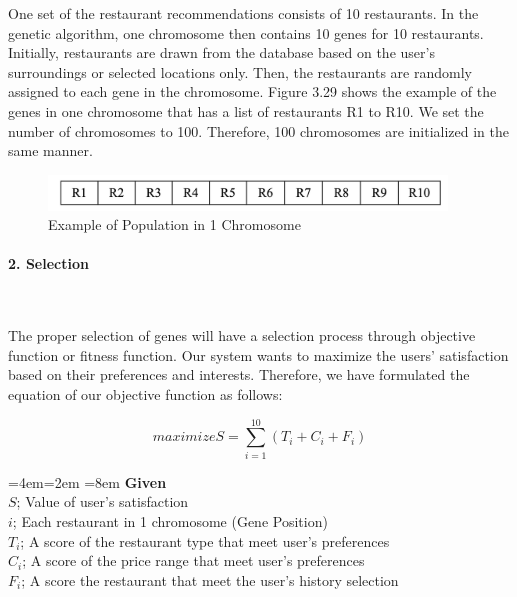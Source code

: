 \documentclass[12pt,oneside,openright,a4paper]{cpe-english-project}
\newenvironment{blockquote}{%
  \par%
  \medskip
  \leftskip=4em\rightskip=2em%
  \noindent\ignorespaces}{%
  \par\medskip}
\begin{document}
One set of the restaurant recommendations consists of 10 restaurants. In the genetic algorithm, one chromosome then contains 10 genes for 10 restaurants.  Initially, restaurants are drawn from the database based on the user's surroundings or selected locations only. Then, the restaurants are randomly assigned to each gene in the chromosome. Figure 3.29 shows the example of the genes in one chromosome that has a list of restaurants R1 to R10. We set the number of chromosomes to 100. Therefore, 100 chromosomes are initialized in the same manner.

\begin{figure}[H]\centering
\includegraphics[width=300pt]{./images/3ga_init.png}
\caption{Example of Population in 1 Chromosome}\label{fig:3ga_init}
\end{figure}

\paragraph*{2. Selection}\

The proper selection of genes will have a selection process through objective function or fitness function. Our system wants to maximize the users’ satisfaction based on their preferences and interests. Therefore, we have formulated the equation of our objective function as follows:

\begin{equation}\label{eq:maximizes}
maximize S = \sum_{i=1}^{10}(T_i + C_i + F_i)
\end{equation}

\begin{blockquote}\leftskip=8em
\textbf{Given}\\
$S$; Value of user’s satisfaction\\
$i$; Each restaurant in 1 chromosome (Gene Position)\\
$T_i$; A score of the restaurant type that meet user’s preferences\\
$C_i$; A score of the price range that meet user’s preferences\\
$F_i$; A score  the restaurant that meet the user’s history selection

\end{blockquote}
\end{document}
